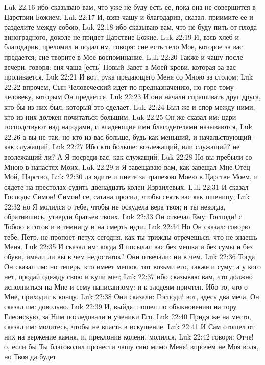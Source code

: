 Luk 22:16  ибо сказываю вам, что уже не буду есть ее, пока она не совершится в Царствии Божием.
Luk 22:17  И, взяв чашу и благодарив, сказал: приимите ее и разделите между собою,
Luk 22:18  ибо сказываю вам, что не буду пить от плода виноградного, доколе не придет Царствие Божие.
Luk 22:19  И, взяв хлеб и благодарив, преломил и подал им, говоря: сие есть тело Мое, которое за вас предается; сие творите в Мое воспоминание.
Luk 22:20  Также и чашу после вечери, говоря: сия чаша [есть] Новый Завет в Моей крови, которая за вас проливается.
Luk 22:21  И вот, рука предающего Меня со Мною за столом;
Luk 22:22  впрочем, Сын Человеческий идет по предназначению, но горе тому человеку, которым Он предается.
Luk 22:23  И они начали спрашивать друг друга, кто бы из них был, который это сделает.
Luk 22:24  Был же и спор между ними, кто из них должен почитаться большим.
Luk 22:25  Он же сказал им: цари господствуют над народами, и владеющие ими благодетелями называются,
Luk 22:26  а вы не так: но кто из вас больше, будь как меньший, и начальствующий--как служащий.
Luk 22:27  Ибо кто больше: возлежащий, или служащий? не возлежащий ли? А Я посреди вас, как служащий.
Luk 22:28  Но вы пребыли со Мною в напастях Моих,
Luk 22:29  и Я завещаваю вам, как завещал Мне Отец Мой, Царство,
Luk 22:30  да ядите и пиете за трапезою Моею в Царстве Моем, и сядете на престолах судить двенадцать колен Израилевых.
Luk 22:31  И сказал Господь: Симон! Симон! се, сатана просил, чтобы сеять вас как пшеницу,
Luk 22:32  но Я молился о тебе, чтобы не оскудела вера твоя; и ты некогда, обратившись, утверди братьев твоих.
Luk 22:33  Он отвечал Ему: Господи! с Тобою я готов и в темницу и на смерть идти.
Luk 22:34  Но Он сказал: говорю тебе, Петр, не пропоет петух сегодня, как ты трижды отречешься, что не знаешь Меня.
Luk 22:35  И сказал им: когда Я посылал вас без мешка и без сумы и без обуви, имели ли вы в чем недостаток? Они отвечали: ни в чем.
Luk 22:36  Тогда Он сказал им: но теперь, кто имеет мешок, тот возьми его, также и суму; а у кого нет, продай одежду свою и купи меч;
Luk 22:37  ибо сказываю вам, что должно исполниться на Мне и сему написанному: и к злодеям причтен. Ибо то, что о Мне, приходит к концу.
Luk 22:38  Они сказали: Господи! вот, здесь два меча. Он сказал им: довольно.
Luk 22:39  И, выйдя, пошел по обыкновению на гору Елеонскую, за Ним последовали и ученики Его.
Luk 22:40  Придя же на место, сказал им: молитесь, чтобы не впасть в искушение.
Luk 22:41  И Сам отошел от них на вержение камня, и, преклонив колени, молился,
Luk 22:42  говоря: Отче! о, если бы Ты благоволил пронести чашу сию мимо Меня! впрочем не Моя воля, но Твоя да будет.
